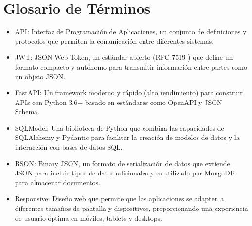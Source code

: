 \documentclass[12pt,a4paper]{report}
\begin{document}
\chapter*{Glosario de Términos}
\begin{itemize}
    \item API: Interfaz de Programación de Aplicaciones, un conjunto de definiciones y protocolos que permiten la comunicación entre diferentes sistemas.
    \item JWT: JSON Web Token, un estándar abierto (RFC 7519 \cite{rfc7519}) que define un formato compacto y autónomo para transmitir información entre partes como un objeto JSON.
    \item FastAPI: Un framework moderno y rápido (alto rendimiento) para construir APIs con Python 3.6+ basado en estándares como OpenAPI y JSON Schema.
    \item SQLModel: Una biblioteca de Python que combina las capacidades de SQLAlchemy y Pydantic para facilitar la creación de modelos de datos y la interacción con bases de datos SQL.
    \item BSON: Binary JSON, un formato de serialización de datos que extiende JSON para incluir tipos de datos adicionales y es utilizado por MongoDB para almacenar documentos.
    \item Responsive: Diseño web que permite que las aplicaciones se adapten a diferentes tamaños de pantalla y dispositivos, proporcionando una experiencia de usuario óptima en móviles, tablets y desktops.
\end{itemize}




\end{document}
